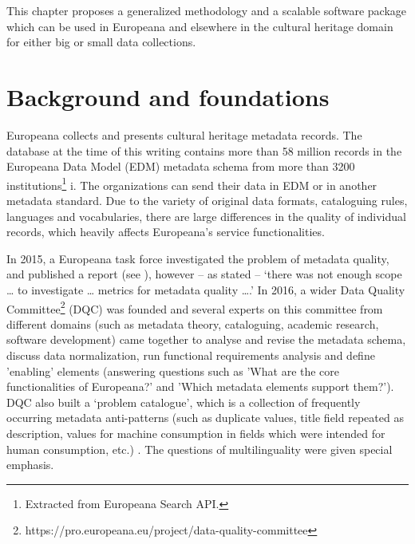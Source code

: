 This chapter proposes a generalized methodology and a scalable software package which can be used in Europeana and elsewhere in the cultural heritage domain for either big or small data collections.

\section{Background and foundations}

Europeana collects and presents cultural heritage metadata records. The database at the time of this writing contains more than 58 million records in the Europeana Data Model (EDM) metadata schema from more than 3200 institutions\footnote{Extracted from Europeana Search API.} i. The organizations can send their data in EDM or in another metadata standard. Due to the variety of original data formats, cataloguing rules, languages and vocabularies, there are large differences in the quality of individual records, which heavily affects Europeana's service functionalities.

In 2015, a Europeana task force investigated the problem of metadata quality, and published a report (see \cite{dangerfield2015}), however -- as stated -- `there was not enough scope … to investigate … metrics for metadata quality ….' In 2016, a wider Data Quality Committee\footnote{https://pro.europeana.eu/project/data-quality-committee} (DQC) was founded and several experts on this committee from different domains (such as metadata theory, cataloguing, academic research, software development) came together to analyse and revise the metadata schema, discuss data normalization, run functional requirements analysis and define 'enabling' elements (answering questions such as 'What are the core functionalities of Europeana?' and 'Which metadata elements support them?'). DQC also built a ‘problem catalogue’, which is a collection of frequently occurring metadata anti-patterns (such as duplicate values, title field repeated as description, values for machine consumption in fields which were intended for human consumption, etc.) \cite{hill-manguinhas2016}. The questions of multilinguality were given special emphasis.

